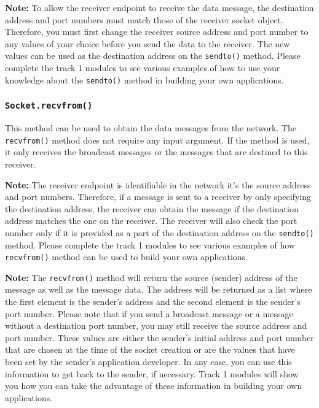 \documentclass[11pt]{article}
\begin{document}
\textbf{Note:}
To allow the receiver endpoint to receive the data message, the destination address and port numbers must match those of the receiver socket object. Therefore, you must first change the receiver source address and port number to any values of your choice before you send the data to the receiver. The new values can be used as the destination address on the \texttt{sendto()} method. Please complete the track 1 modules to see various examples of how to use your knowledge about the \texttt{sendto()} method in building your own applications.

\subsubsection{\texttt{Socket.\textbf{recvfrom()}}}
This method can be used to obtain the data messages from the network. The \texttt{recvfrom()} method does not require any input argument. If the method is used, it only receives the broadcast messages or the messages that are destined to this receiver.

\textbf{Note:}
The receiver endpoint is identifiable in the network it's the source address and port numbers. Therefore, if a message is sent to a receiver by only specifying the destination address, the receiver can obtain the message if the destination address matches the one on the receiver. The receiver will also check the port number only if it is provided as a part of the destination address on the \texttt{sendto()} method. Please complete the track 1 modules to see various examples of how \texttt{recvfrom()} method can be used to build your own applications.

\textbf{Note:}
The \texttt{recvfrom()} method will return the source (sender) address of the message as well as the message data. The address will be returned as a list where the first element is the sender's address and the second element is the sender's port number. Please note that if you send a broadcast message or a message without a destination port number, you may still receive the source address and port number. These values are either the sender's initial address and port number that are chosen at the time of the socket creation or are the values that have been set by the sender's application developer. In any case, you can use this information to get back to the sender, if necessary. Track 1 modules will show you how you can take the advantage of these information in building your own applications.
\end{document}
